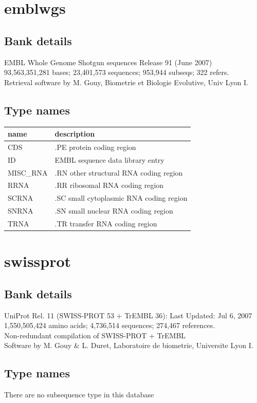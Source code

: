 \documentclass{article}
\begin{document}
\begin{Schunk}
\section{ emblwgs }
\subsection{Bank details}
EMBL Whole Genome Shotgun sequences Release 91  (June 2007)\\
93,563,351,281 bases; 23,401,573 sequences; 953,944 subseqs; 322 refers.\\
Retrieval software by M. Gouy, Biometrie et Biologie Evolutive, Univ Lyon I.

\subsection{Type names}
\noindent\begin{tabular}{ll}
\hline \hline
name & description\\
\hline
CDS & .PE protein coding region \\
ID & EMBL sequence data library entry \\
MISC\_RNA & .RN other structural RNA coding region \\
RRNA & .RR ribosomal RNA coding region \\
SCRNA & .SC small cytoplasmic RNA coding region \\
SNRNA & .SN small nuclear RNA coding region \\
TRNA & .TR transfer RNA coding region \\
\hline \hline
\end{tabular}

\section{ swissprot }
\subsection{Bank details}
UniProt Rel. 11 (SWISS-PROT 53 + TrEMBL 36): Last Updated: Jul  6, 2007\\
1,550,505,424 amino acids; 4,736,514 sequences; 274,467 references.\\
Non-redundant compilation of SWISS-PROT + TrEMBL\\
Software by M. Gouy \& L. Duret, Laboratoire de biometrie, Universite Lyon I.

\subsection{Type names}
There are no subsequence type in this database

\end{Schunk}
\end{document}
